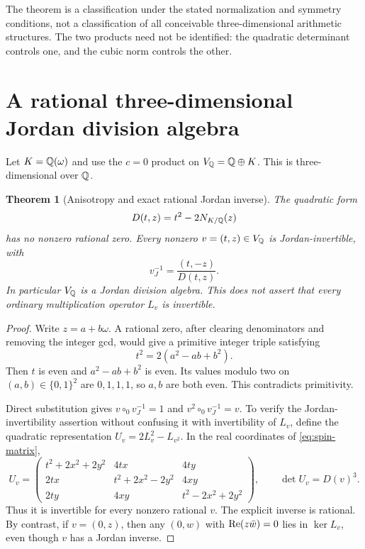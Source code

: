 \documentclass[11pt]{article}
\newtheorem{theorem}{Theorem}[section]
\theoremstyle{definition}\newtheorem{definition}[theorem]{Definition}
\begin{document}
The theorem is a classification under the stated normalization and symmetry conditions, not a classification of all conceivable three-dimensional arithmetic structures. The two products need not be identified: the quadratic determinant controls one, and the cubic norm controls the other.

\section{A rational three-dimensional Jordan division algebra}
Let $K=\mathbb Q(\omega)$ and use the $c=0$ product on $V_\mathbb Q=\mathbb Q\oplus K$. This is three-dimensional over $\mathbb Q$.

\begin{theorem}[Anisotropy and exact rational Jordan inverse]\label{thm:rational}
The quadratic form
\[
 D(t,z)=t^2-2N_{K/\mathbb Q}(z)
\]
has no nonzero rational zero. Every nonzero $v=(t,z)\in V_\mathbb Q$ is Jordan-invertible, with
\begin{equation}
 v^{-1}_{J}=\frac{(t,-z)}{D(t,z)}.
\end{equation}
In particular $V_\mathbb Q$ is a Jordan division algebra. This does not assert that every ordinary multiplication operator $L_v$ is invertible.
\end{theorem}
\begin{proof}
Write $z=a+b\omega$. A rational zero, after clearing denominators and removing the integer gcd, would give a primitive integer triple satisfying
\[
 t^2=2(a^2-ab+b^2).
\]
Then $t$ is even and $a^2-ab+b^2$ is even. Its values modulo two on $(a,b)\in\{0,1\}^2$ are $0,1,1,1$, so $a,b$ are both even. This contradicts primitivity.

Direct substitution gives $v\circ_0v^{-1}_J=1$ and $v^2\circ_0v^{-1}_J=v$. To verify the Jordan-invertibility assertion without confusing it with invertibility of $L_v$, define the quadratic representation $U_v=2L_v^2-L_{v^2}$. In the real coordinates of \eqref{eq:spin-matrix},
\[
 U_v=\begin{pmatrix}
 t^2+2x^2+2y^2&4tx&4ty\\
 2tx&t^2+2x^2-2y^2&4xy\\
 2ty&4xy&t^2-2x^2+2y^2
 \end{pmatrix},
\qquad \det U_v=D(v)^3.
\]
Thus it is invertible for every nonzero rational $v$. The explicit inverse is rational. By contrast, if $v=(0,z)$, then any $(0,w)$ with $\operatorname{Re}(z\bar w)=0$ lies in $\ker L_v$, even though $v$ has a Jordan inverse.
\end{proof}
\end{document}
